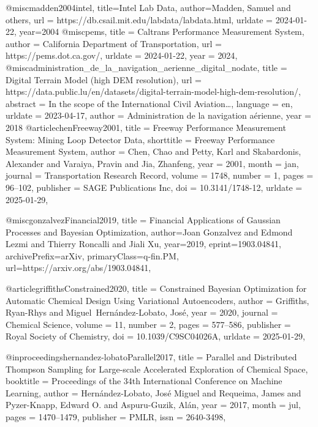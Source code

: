 @misc{madden2004intel,
  title={Intel Lab Data},
  author={Madden, Samuel and others},
  url = {https://db.csail.mit.edu/labdata/labdata.html},
  urldate = {2024-01-22},
  year={2004}
}
@misc{pems,
    title = {Caltrans Performance Measurement System},
    author = {{California Department of Transportation}},
    url = {https://pems.dot.ca.gov/},
    urldate = {2024-01-22},
    year = {2024},
}
@misc{administration_de_la_navigation_aerienne_digital_nodate,
	title = {Digital {Terrain} {Model} (high {DEM} resolution)},
	url = {https://data.public.lu/en/datasets/digital-terrain-model-high-dem-resolution/},
	abstract = {In the scope of the International Civil Aviation…},
	language = {en},
	urldate = {2023-04-17},
	author = {{Administration de la navigation aérienne}},
    year = {2018}
}
@article{chenFreeway2001,
  title = {Freeway {{Performance Measurement System}}: {{Mining Loop Detector Data}}},
  shorttitle = {Freeway {{Performance Measurement System}}},
  author = {Chen, Chao and Petty, Karl and Skabardonis, Alexander and Varaiya, Pravin and Jia, Zhanfeng},
  year = {2001},
  month = jan,
  journal = {Transportation Research Record},
  volume = {1748},
  number = {1},
  pages = {96--102},
  publisher = {SAGE Publications Inc},
  doi = {10.3141/1748-12},
  urldate = {2025-01-29},
}


@misc{gonzalvezFinancial2019,
      title = {Financial {{Applications}} of {{Gaussian Processes}} and {{Bayesian Optimization}}},
      author={Joan Gonzalvez and Edmond Lezmi and Thierry Roncalli and Jiali Xu},
      year={2019},
      eprint={1903.04841},
      archivePrefix={arXiv},
      primaryClass={q-fin.PM},
      url={https://arxiv.org/abs/1903.04841}, 
}

@article{griffithsConstrained2020,
  title = {Constrained {{Bayesian}} Optimization for Automatic Chemical Design Using Variational Autoencoders},
  author = {Griffiths, Ryan-Rhys and {Miguel~Hern{\'a}ndez-Lobato}, Jos{\'e}},
  year = {2020},
  journal = {Chemical Science},
  volume = {11},
  number = {2},
  pages = {577--586},
  publisher = {Royal Society of Chemistry},
  doi = {10.1039/C9SC04026A},
  urldate = {2025-01-29},
}

@inproceedings{hernandez-lobatoParallel2017,
  title = {Parallel and {{Distributed Thompson Sampling}} for {{Large-scale Accelerated Exploration}} of {{Chemical Space}}},
  booktitle = {Proceedings of the 34th {{International Conference}} on {{Machine Learning}}},
  author = {{Hern{\'a}ndez-Lobato}, Jos{\'e} Miguel and Requeima, James and {Pyzer-Knapp}, Edward O. and {Aspuru-Guzik}, Al{\'a}n},
  year = {2017},
  month = jul,
  pages = {1470--1479},
  publisher = {PMLR},
  issn = {2640-3498},
}

